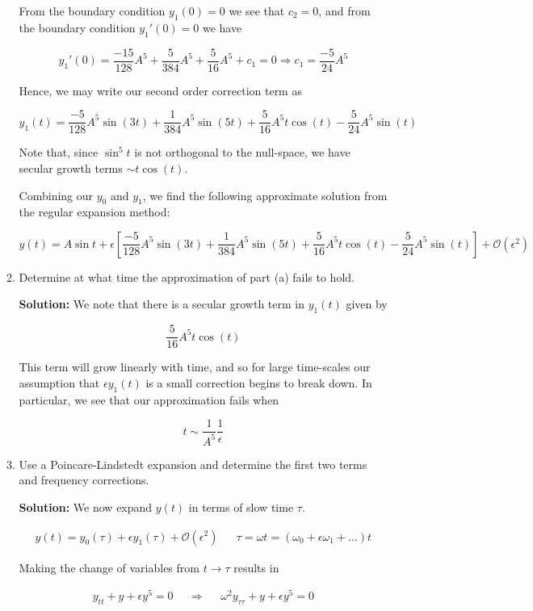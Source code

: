 \documentclass[12pt, a4paper]{article}
\begin{document}
\begin{enumerate}
\begin{enumerate}
    From the boundary condition $y_1(0)=0$ we see that $c_2=0$, and from the boundary condition $y_1'(0)=0$ we have 

    $$y_1'(0) = \frac{-15}{128} A^5 + \frac{5}{384} A^5 + \frac{5}{16}A^5 + c_1 = 0 \Rightarrow c_1 = \frac{-5}{24}A^5$$

    Hence, we may write our second order correction term as 

    $$y_1(t) = \frac{-5}{128} A^5 \sin(3t)+\frac{1}{384}A^5 \sin(5t) + \frac{5}{16} A^5 t\cos(t) - \frac{5}{24}A^5 \sin(t)$$

    Note that, since $\sin^5 t$ is not orthogonal to the null-space, we have secular growth terms $\sim t \cos(t)$. 

    Combining our $y_0$ and $y_1$, we find the following approximate solution from the regular expansion method:

    $$y(t) = A \sin t + \epsilon \left[ \frac{-5}{128} A^5 \sin(3t)+\frac{1}{384}A^5 \sin(5t) + \frac{5}{16} A^5 t\cos(t) - \frac{5}{24}A^5 \sin(t) \right] + \mathcal{O}(\epsilon^2)$$

    \item Determine at what time the approximation of part (a) fails to hold.

    \textbf{Solution:} We note that there is a secular growth term in $y_1(t)$ given by

    $$\frac{5}{16} A^5 t\cos(t)$$

    This term will grow linearly with time, and so for large time-scales our assumption that $\epsilon y_1(t)$ is a small correction begins to break down. In particular, we see that our approximation fails when 

    $$t \sim \frac{1}{A^5} \frac{1}{\epsilon}$$

    \item Use a Poincare-Lindstedt expansion and determine the first two terms and frequency corrections.

    \textbf{Solution:} We now expand $y(t)$ in terms of slow time $\tau$.

    \begin{align*}
        y(t) = y_0(\tau) + \epsilon y_1(\tau) + \mathcal{O}(\epsilon^2) && \tau = \omega t = (\omega_0 + \epsilon \omega_1 + \dots) t
    \end{align*}

    Making the change of variables from $t \rightarrow \tau$ results in

    \begin{align*}
        y_{tt} + y + \epsilon y^5 = 0 && \Rightarrow && \omega^2 y_{\tau \tau} + y + \epsilon y^5 = 0
    \end{align*}


\end{enumerate}
\end{enumerate}
\end{document}
